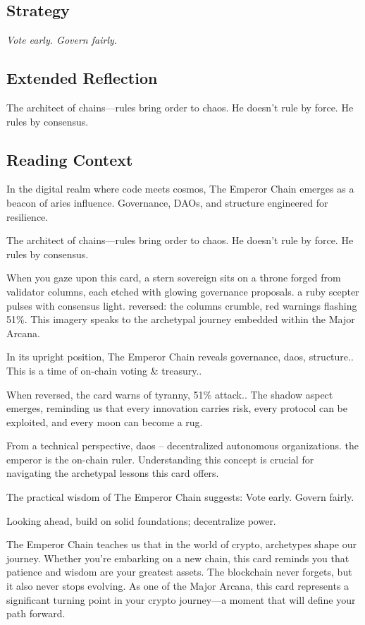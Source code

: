 \documentclass[11pt,oneside]{book}
\begin{document}
\begin{minipage}[t]{0.55\textwidth}
  \subsection*{Strategy}
  \textit{Vote early. Govern fairly.}

  \subsection*{Extended Reflection}
  The architect of chains—rules bring order to chaos. He doesn't rule by force. He rules by consensus.

  \subsection*{Reading Context}
  In the digital realm where code meets cosmos, The Emperor Chain emerges as a beacon of aries influence. Governance, DAOs, and structure engineered for resilience.

  The architect of chains—rules bring order to chaos. He doesn't rule by force. He rules by consensus.

  When you gaze upon this card, a stern sovereign sits on a throne forged from validator columns, each etched with glowing governance proposals. a ruby scepter pulses with consensus light. reversed: the columns crumble, red warnings flashing 51\%. This imagery speaks to the archetypal journey embedded within the Major Arcana.

  In its upright position, The Emperor Chain reveals governance, daos, structure.. This is a time of on-chain voting \& treasury..

  When reversed, the card warns of tyranny, 51\% attack.. The shadow aspect emerges, reminding us that every innovation carries risk, every protocol can be exploited, and every moon can become a rug.

  From a technical perspective, daos – decentralized autonomous organizations. the emperor is the on-chain ruler. Understanding this concept is crucial for navigating the archetypal lessons this card offers.

  The practical wisdom of The Emperor Chain suggests: Vote early. Govern fairly.

  Looking ahead, build on solid foundations; decentralize power.

  The Emperor Chain teaches us that in the world of crypto, archetypes shape our journey. Whether you're embarking on a new chain, this card reminds you that patience and wisdom are your greatest assets. The blockchain never forgets, but it also never stops evolving. As one of the Major Arcana, this card represents a significant turning point in your crypto journey—a moment that will define your path forward.

\end{minipage}
\end{document}
